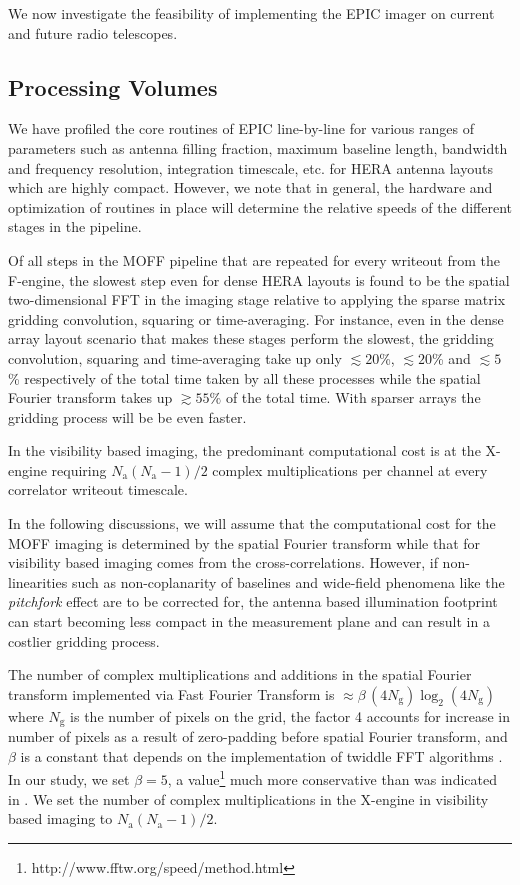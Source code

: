 \documentclass[a4paper,fleqn,usenatbib]{mnras}
\newcommand{\Nant}{N_\textrm{a}}
\newcommand{\Ngrid}{N_\textrm{g}}
\begin{document}
We now investigate the feasibility of implementing the EPIC imager on current
and future radio telescopes. 

\subsection{Processing Volumes}

We have profiled the core routines of EPIC line-by-line for various ranges of 
parameters such as antenna filling fraction, maximum baseline length, bandwidth 
and frequency resolution, integration timescale, etc. for HERA antenna layouts 
which are highly compact. However, we note that in general, the hardware and 
optimization of routines in place will determine the relative speeds of the 
different stages in the pipeline. 

Of all steps in the MOFF pipeline that are repeated for every writeout from 
the F-engine, the slowest step even for dense HERA layouts is found to be the 
spatial two-dimensional FFT in the imaging stage relative to applying the sparse 
matrix gridding convolution, squaring or time-averaging. For instance, even in 
the dense array layout scenario that makes these stages perform the slowest, the 
gridding convolution, squaring and time-averaging take up only $\lesssim 20$\%, 
$\lesssim 20$\% and $\lesssim 5$\% respectively of the total time taken by all 
these processes while the spatial Fourier transform takes up $\gtrsim 55\%$ of
the total time. With sparser arrays the gridding process will be be even faster. 

In the visibility based imaging, the predominant computational cost is at
the X-engine requiring $\Nant(\Nant-1)/2$ complex multiplications 
per channel at every correlator writeout timescale. 

In the following discussions, we will assume that the computational cost for
the MOFF imaging is determined by the spatial Fourier transform while  
that for visibility based imaging comes from the cross-correlations. However, 
if non-linearities such as non-coplanarity of baselines \citep{cor08} and 
wide-field phenomena like the {\it pitchfork} effect \citep{thy15a,thy15b} 
are to be corrected for, the antenna based illumination footprint can start 
becoming less compact in the measurement plane and can result in a costlier 
gridding process.

The number of complex multiplications and additions in the spatial Fourier 
transform implemented via Fast Fourier Transform \citep[FFT;][]{coo65} is 
$\approx \beta\,(4\Ngrid)\log_2(4\Ngrid)$ where $\Ngrid$ is the number of 
pixels on the grid, the factor 4 accounts for increase in number of pixels as a 
result of zero-padding before spatial Fourier transform, and $\beta$ is a 
constant that depends on the implementation of twiddle FFT algorithms 
\citep{bri74}. In our study, we set $\beta=5$, a 
value\footnote{http://www.fftw.org/speed/method.html} much more conservative 
than was indicated in \citet{mor11}. We set the number of complex 
multiplications in the X-engine in visibility based imaging to 
$\Nant(\Nant-1)/2$.
\end{document}

